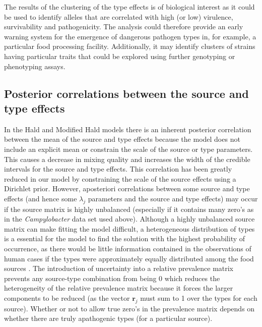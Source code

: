 The results of the clustering of the type effects is of biological interest as it could be used to identify alleles that are correlated with high (or low) virulence, survivability and pathogenicity.
The analysis could therefore provide an early warning system for the emergence of dangerous pathogen types in, for example, a particular food processing facility.
Additionally, it may identify clusters of strains having particular traits that could be explored using further genotyping or phenotyping assays.

\subsection{Posterior correlations between the source and type effects}
In the Hald and Modified Hald models there is an inherent posterior correlation between the mean of the source and type effects because the model does not include an explicit mean or constrain the 
scale of the source or type parameters. This causes a decrease in mixing quality and increases the width of the credible intervals for the source and type effects. This correlation has been greatly 
reduced in our model by constraining the scale of the source effects using a Dirichlet prior. However, aposteriori correlations between some source and type effects (and hence some $\lambda_j$ 
parameters and the source and type effects) may occur if the source matrix is highly unbalanced (especially if it contains many zero's as in the \emph{Campylobacter} data set used above). Although 
a highly unbalanced source matrix can make fitting the model difficult, a heterogeneous distribution of types is a essential for the model to find the solution with the highest probability of occurrence, 
as there would be little information contained in the observations of human cases if the types were approximately equally distributed among the food sources \citep{HaldVosWed04}. The introduction 
of uncertainty into a relative prevalence matrix prevents any source-type combination from being 0 which reduces the heterogeneity of the relative prevalence matrix because it forces the larger 
components to be reduced (as the vector $\mathbf{r}_j$ must sum to 1 over the types for each source). Whether or not to allow true zero's in the prevalence matrix depends on whether there are truly 
apathogenic types (for a particular source).

